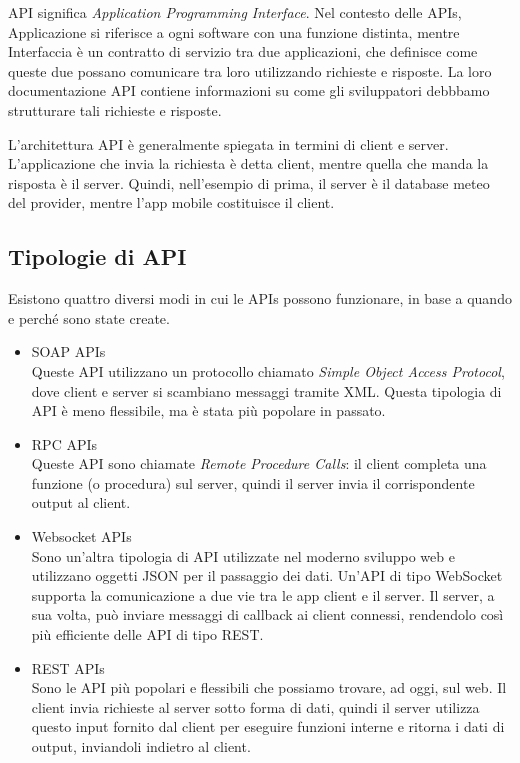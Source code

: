 API significa \textit{Application Programming Interface}. Nel contesto delle APIs, Applicazione si riferisce a ogni software con una funzione distinta, mentre Interfaccia è un contratto di servizio tra due applicazioni, che definisce come queste due possano comunicare tra loro utilizzando richieste e risposte. La loro documentazione API contiene informazioni su come gli sviluppatori debbbamo strutturare tali richieste e risposte.

L'architettura API è generalmente spiegata in termini di client e server. L'applicazione che invia la richiesta è detta client, mentre quella che manda la risposta è il server. Quindi, nell'esempio di prima, il server è il database meteo del provider, mentre l'app mobile costituisce il client.

\subsection{Tipologie di API}
Esistono quattro diversi modi in cui le APIs possono funzionare, in base a quando e perché sono state create.
\begin{itemize}
    \item SOAP APIs\\
    Queste API utilizzano un protocollo chiamato \textit{Simple Object Access Protocol}, dove client e server si scambiano messaggi tramite XML. Questa tipologia di API è meno flessibile, ma è stata più popolare in passato.
    \item RPC APIs\\
    Queste API sono chiamate \textit{Remote Procedure Calls}: il client completa una funzione (o procedura) sul server, quindi il server invia il corrispondente output al client.
    \item Websocket APIs\\
    Sono un'altra tipologia di API utilizzate nel moderno sviluppo web e utilizzano oggetti JSON per il passaggio dei dati. Un'API di tipo WebSocket supporta la comunicazione a due vie tra le app client e il server. Il server, a sua volta, può inviare messaggi di callback ai client connessi, rendendolo così più efficiente delle API di tipo REST.
    \item REST APIs\\
    Sono le API più popolari e flessibili che possiamo trovare, ad oggi, sul web. Il client invia richieste al server sotto forma di dati, quindi il server utilizza questo input fornito dal client per eseguire funzioni interne e ritorna i dati di output, inviandoli indietro al client.
\end{itemize}

